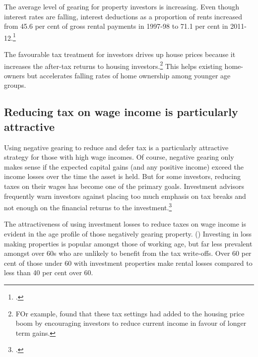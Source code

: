 \documentclass{grattan}\usepackage[]{graphicx}\usepackage[]{color}
\begin{document}
The average level of gearing for property investors is increasing. Even though interest rates are falling, interest deductions as a proportion of rents increased from 45.6 per cent of gross rental payments in 1997-98 to 71.1 per cent in 2011-12.\footcite[p.~65]{Treasury2015}

The favourable tax treatment for investors drives up house prices because it increases the after-tax returns to housing investors.\footnote{FOr example, \textcite{Commission2004} found that these tax settings had added to the housing price boom by encouraging investors to reduce current income in favour of longer term gains.} This helps existing home-owners but accelerates falling rates of home ownership among younger age groups.

\subsection{Reducing tax on wage income is particularly attractive}
Using negative gearing to reduce and defer tax is a particularly attractive strategy for those with high wage incomes. Of course, negative gearing only makes sense if the expected capital gains (and any positive income) exceed the income losses over the time the asset is held. But for some investors, reducing taxes on their wages has become one of the primary goals. Investment advisors frequently warn investors against placing too much emphasis on tax breaks and not enough on the financial returns to the investment.\footcite[See for example:]{Brown2012}

The attractiveness of using investment losses to reduce taxes on wage income is evident in the age profile of those negatively gearing property. () Investing in loss making properties is popular amongst those of working age, but far less prevalent amongst over 60s who are unlikely to benefit from the tax write-offs. Over 60 per cent of those under 60 with investment properties make rental losses compared to less than 40 per cent over 60. 
\end{document}
